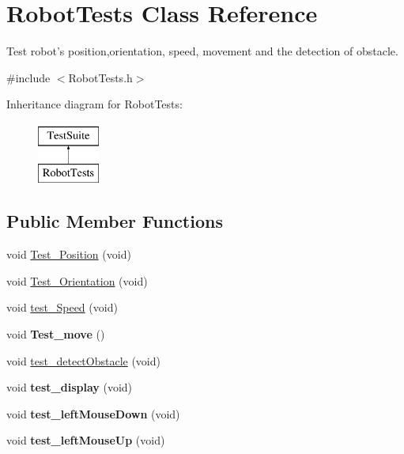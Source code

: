 \hypertarget{classRobotTests}{\section{Robot\-Tests Class Reference}
\label{classRobotTests}
}


Test robot's position,orientation, speed, movement and the detection of obstacle.  




{\ttfamily \#include $<$Robot\-Tests.\-h$>$}

Inheritance diagram for Robot\-Tests\-:\begin{figure}[H]
\begin{center}
\leavevmode
\includegraphics[height=2.000000cm]{classRobotTests}
\end{center}
\end{figure}
\subsection*{Public Member Functions}
\begin{DoxyCompactItemize}
\item 
void \hyperlink{classRobotTests_ac6a7dfed3f30380ec2e85759d8d4808c}{Test\-\_\-\-Position} (void)
\item 
void \hyperlink{classRobotTests_aca7125d3b2733b1b30bed1857c5a97f6}{Test\-\_\-\-Orientation} (void)
\item 
void \hyperlink{classRobotTests_a6d724a2821a085331c532fe1b189d0fc}{test\-\_\-\-Speed} (void)
\item 
\hypertarget{classRobotTests_a5dfdc3ca971f35cf23ddb1a8e364f90a}{void {\bfseries Test\-\_\-move} ()}\label{classRobotTests_a5dfdc3ca971f35cf23ddb1a8e364f90a}

\item 
void \hyperlink{classRobotTests_ae5de21633b1944c8c54b047b6a4982eb}{test\-\_\-detect\-Obstacle} (void)
\item 
\hypertarget{classRobotTests_a9f7fb0d82ad18249333f9b9ab37e6528}{void {\bfseries test\-\_\-display} (void)}\label{classRobotTests_a9f7fb0d82ad18249333f9b9ab37e6528}

\item 
\hypertarget{classRobotTests_a74b1812b3a6a464e070ef6203cb44118}{void {\bfseries test\-\_\-left\-Mouse\-Down} (void)}\label{classRobotTests_a74b1812b3a6a464e070ef6203cb44118}

\item 
\hypertarget{classRobotTests_a96009755981485df4f2df50ef2bd4243}{void {\bfseries test\-\_\-left\-Mouse\-Up} (void)}\label{classRobotTests_a96009755981485df4f2df50ef2bd4243}

\end{DoxyCompactItemize}


